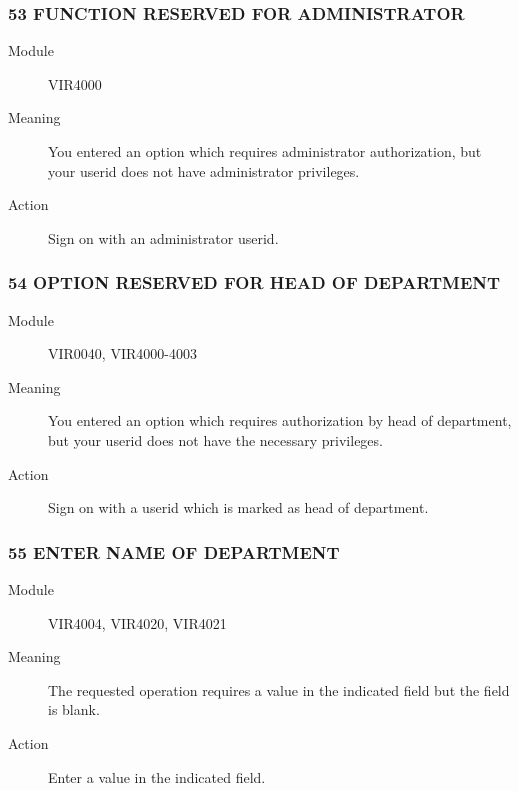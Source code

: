 \documentclass[letterpaper,10pt,english]{sphinxmanual}
\begin{document}
\subsubsection{53 FUNCTION RESERVED FOR ADMINISTRATOR}
\label{\detokenize{messages:function-reserved-for-administrator}}\begin{description}
\item[{Module}] \leavevmode
VIR4000

\item[{Meaning}] \leavevmode
You entered an option which requires administrator authorization, but your userid does not have administrator privileges.

\item[{Action}] \leavevmode
Sign on with an administrator userid.

\end{description}


\subsubsection{54 OPTION RESERVED FOR HEAD OF DEPARTMENT}
\label{\detokenize{messages:option-reserved-for-head-of-department}}\begin{description}
\item[{Module}] \leavevmode
VIR0040, VIR4000-4003

\item[{Meaning}] \leavevmode
You entered an option which requires authorization by head of department, but your userid does not have the necessary privileges.

\item[{Action}] \leavevmode
Sign on with a userid which is marked as head of department.

\end{description}


\subsubsection{55 ENTER NAME OF DEPARTMENT}
\label{\detokenize{messages:enter-name-of-department}}\begin{description}
\item[{Module}] \leavevmode
VIR4004, VIR4020, VIR4021

\item[{Meaning}] \leavevmode
The requested operation requires a value in the indicated field but the field is blank.

\item[{Action}] \leavevmode
Enter a value in the indicated field.

\end{description}
\end{document}
